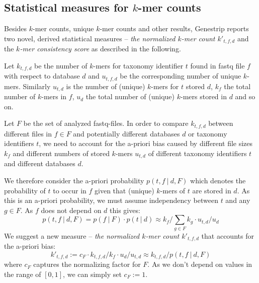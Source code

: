 \documentclass[letterpaper,11pt,leqno]{article}
\begin{document}
\subsection{Statistical measures for $k$-mer counts}

Besides $k$-mer counts, unique $k$-mer counts and other results, Genestrip reports two novel, derived statistical measures -- \emph{the normalized $k$-mer count $k'_{t,f,d}$} and the \emph{$k$-mer consistency score} as described in the following.

Let $k_{t,f,d}$ be the number of $k$-mers for taxonomy identifier $t$ found in fastq file $f$ with respect to database $d$ and $u_{t,f,d}$ be the corresponding number of unique $k$-mers. Similarly $u_{t,d}$ is the number of (unique) $k$-mers for $t$ stored $d$, $k_f$ the total number of $k$-mers in $f$, $u_d$ the total number of (unique) $k$-mers stored in $d$ and so on.

Let $F$ be the set of analyzed fastq-files.
In order to compare $k_{t,f,d}$ between different files in $f \in F$ and potentially different databases $d$ or taxonomy identifiers $t$, we need to account for the a-priori bias caused by different file sizes $k_f$ and different numbers of stored $k$-mers $u_{t,d}$ of different taxonomy identifiers $t$ and different databases $d$.

We therefore consider the a-priori probability $p(t,f\ |\ d,F)$ which denotes the probability of $t$ to occur in $f$ given that (unique) $k$-mers of $t$ are stored in $d$. As this is an a-priori probability, we must assume independency between $t$ and any $g \in F$. As $f$ does not depend on $d$ this gives:
\[ p(t,f\ |\ d, F) = p(f\ |\ F) \cdot p(t\ |\ d) \approx k_{f} / \sum_{g \in F} k_{g} \cdot u_{t,d} / u_d\] 
We suggest a new measure -- \emph{the normalized $k$-mer count $k'_{t,f,d}$} that accounts for the a-priori bias:
\[ k'_{t,f,d} := c_{F} \cdot k_{t,f,d} /  k_{f} \cdot  u_d / u_{t,d} \approx k_{t,f,d} / p(t,f\ |\ d, F) \]
where $c_{F}$ captures the normalizing factor for $F$. As we don't depend on values in the range of $[0,1]$, we can simply set $c_{F} := 1$.
\end{document}
